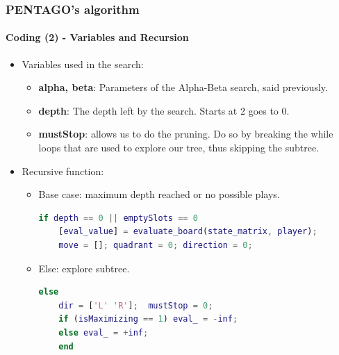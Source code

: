 \documentclass[10pt]{beamer}
\begin{document}
\begin{frame}[fragile]

\frametitle{PENTAGO's algorithm}
\framesubtitle{Coding (2) - Variables and Recursion}

\begin{itemize}
  	\item Variables used in the search:
	
	\begin{itemize}
	  
		\item \textbf{alpha, beta}: Parameters of the Alpha-Beta search, said
		previously.
		\item \textbf{depth}: The depth left by the search. Starts at 2 goes to 0.
		\item \textbf{mustStop}: allows us to do the pruning. Do so by breaking the
		while loops that are used to explore our tree, thus skipping the subtree.

	\end{itemize}
	\item Recursive function:
	
	\begin{itemize}
	  
		\item Base case: maximum depth reached or no possible plays.\\
\begin{lstlisting}[language=Matlab]
if depth == 0 || emptySlots == 0
    [eval_value] = evaluate_board(state_matrix, player);
    move = []; quadrant = 0; direction = 0;
\end{lstlisting}
		\item Else: explore subtree.\\
\begin{lstlisting}[language=Matlab]
else   
    dir = ['L' 'R'];  mustStop = 0;
    if (isMaximizing == 1) eval_ = -inf;
    else eval_ = +inf;
    end
\end{lstlisting}
		
	\end{itemize}
\end{itemize}

\end{frame}
\end{document}
